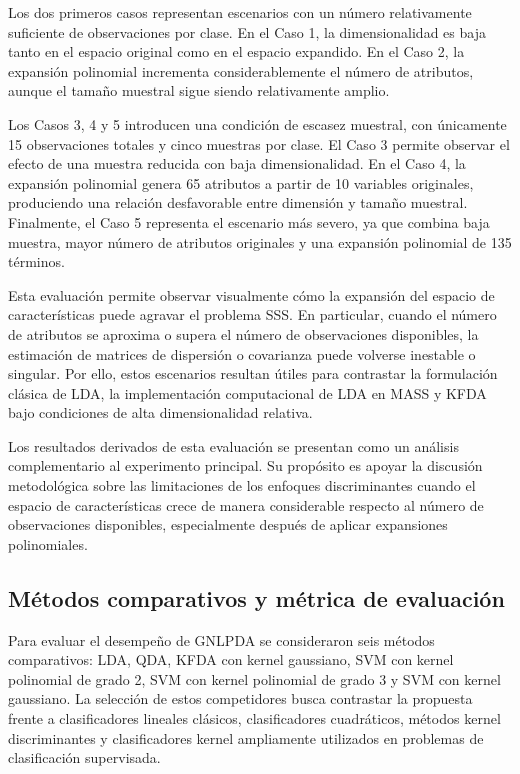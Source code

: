 Los dos primeros casos representan escenarios con un número relativamente
suficiente de observaciones por clase. En el Caso 1, la dimensionalidad es baja tanto en el espacio original como en el espacio expandido. En el Caso 2, la expansión polinomial incrementa considerablemente el número de atributos, aunque el tamaño muestral sigue siendo relativamente amplio.

Los Casos 3, 4 y 5 introducen una condición de escasez muestral, con únicamente 15
observaciones totales y cinco muestras por clase. El Caso 3 permite observar el efecto de una muestra reducida con baja dimensionalidad. En el Caso 4, la expansión polinomial genera 65 atributos a partir de 10 variables originales, produciendo una relación desfavorable entre dimensión y tamaño muestral. Finalmente, el Caso 5 representa el escenario más severo, ya que combina baja muestra, mayor número de atributos originales y una expansión polinomial de 135 términos.

Esta evaluación permite observar visualmente cómo la expansión del espacio de características puede agravar el problema SSS. En particular, cuando el número de atributos se aproxima o supera el número de observaciones disponibles, la estimación de matrices de dispersión o covarianza puede volverse inestable o singular. Por ello, estos escenarios resultan útiles para contrastar la formulación clásica de LDA, la implementación computacional de LDA en MASS y KFDA bajo condiciones de alta dimensionalidad relativa.

Los resultados derivados de esta evaluación se presentan como un análisis complementario al experimento principal. Su propósito es apoyar la discusión metodológica sobre las limitaciones de los enfoques discriminantes cuando el espacio de características crece de manera considerable respecto al número de observaciones disponibles, especialmente después de aplicar expansiones polinomiales.

\subsection{Métodos comparativos y métrica de evaluación}

Para evaluar el desempeño de GNLPDA se consideraron seis métodos comparativos: LDA, QDA, KFDA con kernel gaussiano, SVM con kernel polinomial de grado 2, SVM con kernel polinomial de grado 3 y SVM con kernel gaussiano. La selección de estos competidores busca contrastar la propuesta frente a clasificadores lineales clásicos, clasificadores cuadráticos, métodos kernel discriminantes y clasificadores kernel ampliamente utilizados en problemas de clasificación supervisada.

